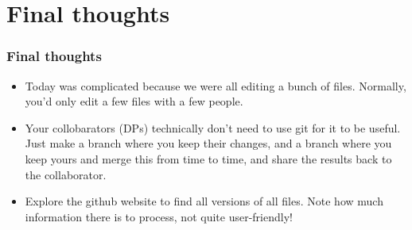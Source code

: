 \documentclass{beamer}
\begin{document}
\section{Final thoughts}

\begin{frame}
	\frametitle{Final thoughts}
	\begin{itemize}
		\item Today was complicated because we were all editing a bunch of files. Normally, you'd only edit a few files with a few people.
		\item Your collobarators (DPs) technically don't need to use git for it to be useful. Just make a branch where you keep their changes, and a branch where you keep yours and merge this from time to time, and share the results back to the collaborator.
		\item Explore the github website to find all versions of all files. Note how much information there is to process, not quite user-friendly!
	\end{itemize}
\end{frame}







\end{document}

